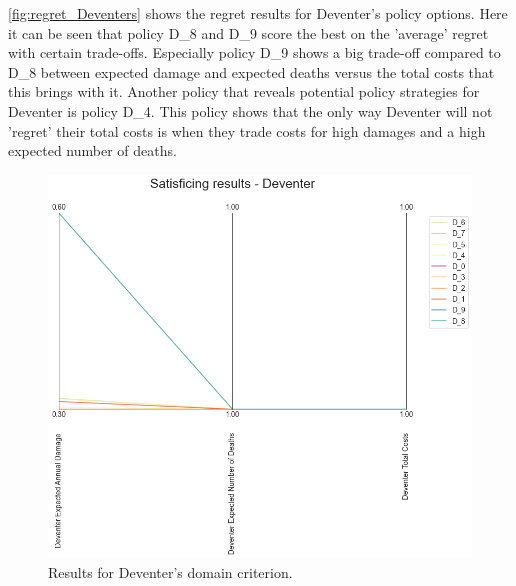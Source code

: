 \noindent \autoref{fig:regret_Deventers} shows the regret results for Deventer's policy options. Here it can be seen that policy D\_8 and D\_9 score the best on the 'average' regret with certain trade-offs. Especially policy D\_9 shows a big trade-off compared to D\_8 between expected damage and expected deaths versus the total costs that this brings with it. Another policy that reveals potential policy strategies for Deventer is policy D\_4. This policy shows that the only way Deventer will not 'regret' their total costs is when they trade costs for high damages and a high expected number of deaths. 
\begin{figure}[H]
  \centering
  \begin{minipage}[b]{0.4\textwidth}
    \includegraphics[width=1.2\textwidth]{report/figures/results/domain_criterion_Deventer.png}
    \caption{Results for Deventer's domain criterion.}
    \label{fig:domain_criterion_Deventers}
  \end{minipage}
  \hfill
  \begin{minipage}[b]{0.4\textwidth}

\end{minipage}
\end{figure}
